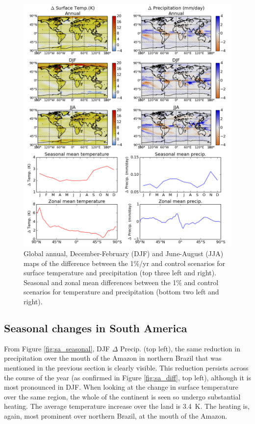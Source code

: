 \documentclass{article}
\begin{document}
\begin{figure}[hbp]
    \centering
    \includegraphics[width=\textwidth]{figures/global_temp_precip}
    \caption{Global annual, December-February (DJF) and June-August (JJA) maps of the difference between the 1\%/yr and control scenarios for surface temperature and precipitation (top three left and right). Seasonal and zonal mean differences between the 1\% and control scenarios for temperature and precipitation (bottom two left and right).}
    \label{fig:global_temp_precip}
\end{figure}

\newpage
\subsection{Seasonal changes in South America}

From Figure \ref{fig:sa_seasonal}, DJF $\Delta$ Precip. (top left), the same reduction in precipitation over the mouth of the Amazon in northern Brazil that was mentioned in the previous section is clearly visible. This reduction persists across the course of the year (as confirmed in Figure \ref{fig:sa_diff}, top left), although it is most pronounced in DJF. When looking at the change in surface temperature over the same region, the whole of the continent is seen so undergo substantial heating. The average temperature increase over the land is \SI{3.4}{K}. The heating is, again, most prominent over northern Brazil, at the mouth of the Amazon.
\end{document}
